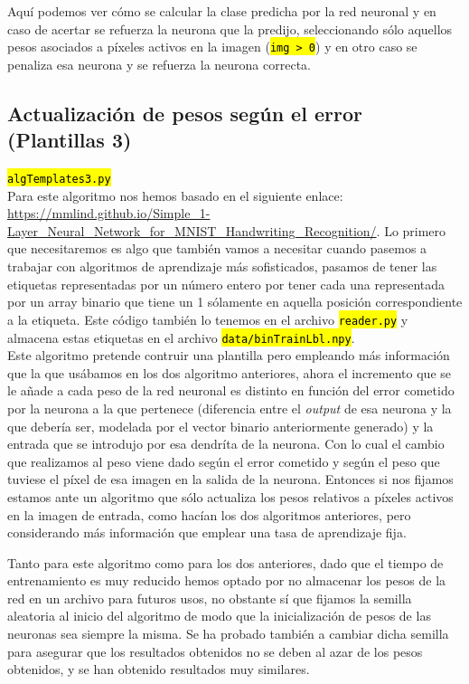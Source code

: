 \documentclass[10pt,a4paper]{article}
\newcommand{\code}[1]{\sethlcolor{light-gray}\hl{\texttt{#1}}} %
\newcommand{\archive}[1]{\sethlcolor{light-green}\hl{\texttt{#1}}} %
\begin{document}
Aquí podemos ver cómo se calcular la clase predicha por la red neuronal y en caso de acertar se refuerza la neurona que la predijo, seleccionando sólo aquellos pesos asociados a píxeles activos en la imagen (\code{img > 0}) y en otro caso se penaliza esa neurona y se refuerza la neurona correcta.

\subsection{Actualización de pesos según el error (Plantillas 3)}
\archive{algTemplates3.py}\\

Para este algoritmo nos hemos basado en el siguiente enlace: \url{https://mmlind.github.io/Simple_1-Layer_Neural_Network_for_MNIST_Handwriting_Recognition/}. Lo primero que necesitaremos es algo que también vamos a necesitar cuando pasemos a trabajar con algoritmos de aprendizaje más sofisticados, pasamos de tener las etiquetas representadas por un número entero por tener cada una representada por un array binario que tiene un 1 sólamente en aquella posición correspondiente a la etiqueta. Este código también lo tenemos en el archivo \archive{reader.py} y almacena estas etiquetas en el archivo \archive{data/binTrainLbl.npy}.\\

Este algoritmo pretende contruir una plantilla pero empleando más información que la que usábamos en los dos algoritmo anteriores, ahora el incremento que se le añade a cada peso de la red neuronal es distinto en función del error cometido por la neurona a la que pertenece (diferencia entre el \textit{output} de esa neurona y la que debería ser, modelada por el vector binario anteriormente generado) y la entrada que se introdujo por esa dendríta de la neurona. Con lo cual el cambio que realizamos al peso viene dado según el error cometido y según el peso que tuviese el píxel de esa imagen en la salida de la neurona. Entonces si nos fijamos estamos ante un algoritmo que sólo actualiza los pesos relativos a píxeles activos en la imagen de entrada, como hacían los dos algoritmos anteriores, pero considerando más información que emplear una tasa de aprendizaje fija.

Tanto para este algoritmo como para los dos anteriores, dado que el tiempo de entrenamiento es muy reducido hemos optado por no almacenar los pesos de la red en un archivo para futuros usos, no obstante sí que fijamos la semilla aleatoria al inicio del algoritmo de modo que la inicialización de pesos de las neuronas sea siempre la misma. Se ha probado también a cambiar dicha semilla para asegurar que los resultados obtenidos no se deben al azar de los pesos obtenidos, y se han obtenido resultados muy similares.\\
\end{document}

